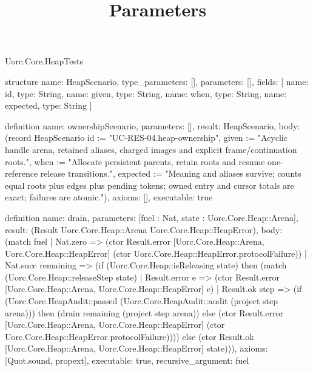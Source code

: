\begin{lexlean}{Uorc.Core.HeapTests}
\title{Parameters}
\begin{semanticmodule}
structure{
  name: HeapScenario,
  type_parameters: [],
  parameters: [],
  fields: [
    {name: id, type: String},
    {name: given, type: String},
    {name: when, type: String},
    {name: expected, type: String}
  ]
}

definition{
  name: ownershipScenario,
  parameters: [],
  result: HeapScenario,
  body: (record HeapScenario {id := "UC-RES-04.heap-ownership", given := "Acyclic handle arena, retained aliases, charged images and explicit frame/continuation roots.", when := "Allocate persistent parents, retain roots and resume one-reference release transitions.", expected := "Meaning and aliases survive; counts equal roots plus edges plus pending tokens; owned entry and cursor totals are exact; failures are atomic."}),
  axioms: [],
  executable: true
}

definition{
  name: drain,
  parameters: [fuel : Nat, state : Uorc.Core.Heap::Arena],
  result: (Result Uorc.Core.Heap::Arena Uorc.Core.Heap::HeapError),
  body: (match fuel
    | Nat.zero => (ctor Result.error [Uorc.Core.Heap::Arena, Uorc.Core.Heap::HeapError] (ctor Uorc.Core.Heap::HeapError.protocolFailure))
    | Nat.succ remaining => (if (Uorc.Core.Heap::isReleasing state) then (match (Uorc.Core.Heap::releaseStep state)
      | Result.error e => (ctor Result.error [Uorc.Core.Heap::Arena, Uorc.Core.Heap::HeapError] e)
      | Result.ok step => (if (Uorc.Core.HeapAudit::passed (Uorc.Core.HeapAudit::audit (project step arena))) then (drain remaining (project step arena)) else (ctor Result.error [Uorc.Core.Heap::Arena, Uorc.Core.Heap::HeapError] (ctor Uorc.Core.Heap::HeapError.protocolFailure)))) else (ctor Result.ok [Uorc.Core.Heap::Arena, Uorc.Core.Heap::HeapError] state))),
  axioms: [Quot.sound, propext],
  executable: true,
  recursive_argument: fuel
}


\end{semanticmodule}
\end{lexlean}
